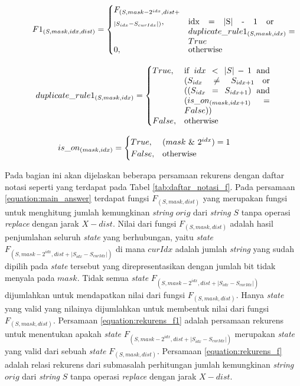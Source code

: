 \begin{equation}
F1_{(S, mask, idx, dist)} = 
\begin{cases}
F_{(S, mask - 2^{idx}, dist +}\\_{|S_{idx} - S_{curIdx}|)}
, & \parbox[t]{.3\textwidth}{idx = |S| - 1 or $duplicate\_rule1_{(S, mask, idx)} = True$}\\
0, & \text{otherwise}
\end{cases}
\label{equation:rekurens_f1}
\end{equation}


\begin{equation}
duplicate\_rule1_{(S, mask, idx)} = 
\begin{cases}
True, & \parbox[t]{.3\textwidth}{if $idx < |S| -1$ and ($S_{idx} \neq S_{idx + 1}$  \text{or} (($S_{idx} = S_{idx + 1}$)  \text{and} ($is\_on_{(mask, idx + 1)} =  False$))}\\
False, & \text{otherwise}
\label{equation:rekurens_duplicate_rule1}
\end{cases}
\end{equation}

\begin{equation*}
	is\_on_{(mask, idx)} = 
	\begin{cases}
		True, & \parbox[t]{.3\textwidth}{($mask$ \& $2^{idx}) = 1$}\\
		False, & \text{otherwise}
	\end{cases}
\end{equation*}

Pada bagian ini akan dijelaskan beberapa persamaan rekurens dengan daftar notasi seperti yang terdapat pada Tabel \ref{tab:daftar_notasi_f}. Pada persamaan \ref{equation:main_answer} terdapat fungsi $F_{(S, mask, dist)}$ yang merupakan fungsi untuk menghitung jumlah kemungkinan \textit{string} $orig$ dari \textit{string} $S$ tanpa operasi \textit{replace} dengan jarak $X-dist$. Nilai dari fungsi $F_{(S, mask, dist)}$ adalah hasil penjumlahan seluruh \textit{state} yang berhubungan, yaitu \textit{state} $F_{(S, mask - 2^{idx}, dist +|S_{idx} - S_{curIdx}|)}$ di mana $curIdx$ adalah jumlah \textit{string} yang sudah dipilih pada \textit{state} tersebut yang direpresentasikan dengan jumlah bit tidak menyala pada $mask$. Tidak semua \textit{state} $F_{(S, mask - 2^{idx}, dist +|S_{idx} - S_{curIdx}|)}$ dijumlahkan untuk mendapatkan nilai dari fungsi $F_{(S, mask, dist)}$. Hanya \textit{state} yang valid yang nilainya dijumlahkan untuk membentuk nilai dari fungsi $F_{(S, mask, dist)}$. Persamaan \ref{equation:rekurens_f1} adalah persamaan rekurens untuk menentukan apakah \textit{state} $F_{(S, mask - 2^{idx}, dist +|S_{idx} - S_{curIdx}|)}$ merupakan \textit{state} yang valid dari sebuah \textit{state} $F_{(S, mask, dist)}$. Persamaan \ref{equation:rekurens_f} adalah relasi rekurens dari submasalah perhitungan jumlah kemungkinan \textit{string} $orig$ dari \textit{string} $S$ tanpa operasi \textit{replace} dengan jarak $X-dist$.


